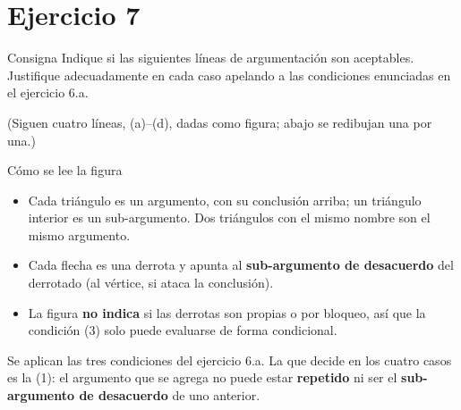 \documentclass[11pt,a4paper]{article}
\begin{document}
\section{Ejercicio 7}

\newcommand{\subtri}[7]{%
  \draw[thick, draw=#7, fill=#7!60] (#1-#3,#2) -- (#1,#2+#4) -- (#1+#3,#2) -- cycle;
  \node[font=\scriptsize\bfseries, text=white] at (#1,#2+0.3*#4) {#5};
  \node[font=\tiny\ttfamily, above=-1pt] at (#1,#2+#4) {#6};}
\newcommand{\nomarg}[2]{\node[font=\scriptsize\bfseries, below] at (#1,0) {#2};}
\newcommand{\cruz}[2]{\node[font=\huge, text=red!70!black] at (#1,#2) {\texttimes};}

\begin{enunciado}{Consigna}
Indique si las siguientes líneas de argumentación son aceptables. Justifique adecuadamente en cada caso apelando a las condiciones enunciadas en el ejercicio 6.a.

(Siguen cuatro líneas, (a)--(d), dadas como figura; abajo se redibujan una por una.)
\end{enunciado}

\begin{aviso}{Cómo se lee la figura}
\begin{itemize}
  \item Cada triángulo es un argumento, con su conclusión arriba; un triángulo interior es un sub-argumento. Dos triángulos con el mismo nombre son el mismo argumento.
  \item Cada flecha es una derrota y apunta al \textbf{sub-argumento de desacuerdo} del derrotado (al vértice, si ataca la conclusión).
  \item La figura \textbf{no indica} si las derrotas son propias o por bloqueo, así que la condición (3) solo puede evaluarse de forma condicional.
\end{itemize}
\end{aviso}

Se aplican las tres condiciones del ejercicio 6.a. La que decide en los cuatro casos es la (1): el argumento que se agrega no puede estar \textbf{repetido} ni ser el \textbf{sub-argumento de desacuerdo} de uno anterior.
\end{document}
